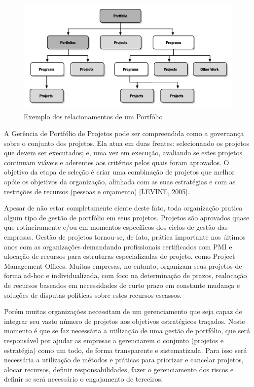 \documentclass[a4paper,10pt]{article}
\begin{document}
\begin{figure}
\centering
\includegraphics[width=.7\textwidth]{flow_sppm.jpg}
\caption{Exemplo dos relacionamentos de um Portfólio}
\end{figure} 

\flushleft

A Gerência de Portfólio de Projetos pode ser compreendida como a governança sobre o conjunto dos projetos. Ela atua em duas frentes: selecionando os projetos
que devem ser executados; e, uma vez em execução, avaliando se estes projetos continuam viáveis e aderentes aos critérios pelos quais foram aprovados.
O objetivo da etapa de seleção é criar uma combinação de projetos que melhor apóie os objetivos da organização, alinhada com as suas estratégias e com as
restrições de recursos (pessoas e orçamento) [LEVINE, 2005].

\flushleft
Apesar de não estar completamente ciente deste fato, toda organização pratica algum tipo de gestão de portfólio em seus projetos. Projetos são aprovados quase que rotineiramente e/ou em
momentos específicos dos ciclos de gestão das empresas. Gestão de projetos tornou-se, de fato, prática importante nos últimos anos com as organizações demandando profissionais certificados
com PMI e alocação de recursos para estruturas especializadas de projeto, como Project Management Offices. Muitas empresas, no entanto, organizam seus projetos de forma ad-hoc e
individualizada, com foco na determinação de prazos, realocação de recursos baseados em necessidades de curto prazo em constante mudança e soluções de disputas políticas sobre estes
recursos escassos.\cite{artigo}

\flushleft
Porém muitas organizações necessitam de um gerenciamento que seja capaz de integrar seu vasto número de projetos aos objetivos estratégicos traçados.
Neste momento é que se faz necessária a utilização de uma gestão de portfólio, que será responsável por ajudar as empresas a gerenciarem o conjunto (projetos e estratégia) como um todo,
de forma transparente e sistematizada. Para isso será necessária a utilização de métodos e práticas para priorizar e cancelar projetos, alocar recursos, definir responsabilidades,
fazer o gerenciamento dos riscos e definir se será necessário o engajamento de terceiros.
\end{document}
